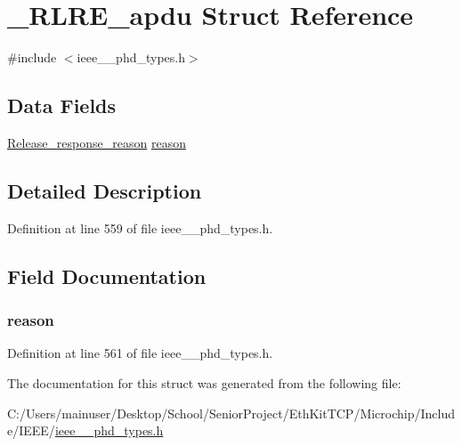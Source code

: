 \hypertarget{struct___r_l_r_e__apdu}{}\section{\+\_\+\+R\+L\+R\+E\+\_\+apdu Struct Reference}
\label{struct___r_l_r_e__apdu}


{\ttfamily \#include $<$ieee\+\_\+\_\+phd\+\_\+types.\+h$>$}

\subsection*{Data Fields}
\begin{DoxyCompactItemize}
\item 
\hyperlink{ieee__11073__phd__types_8h_ac51ddfbfdb1b2d5911d3be45a263d7ba}{Release\+\_\+response\+\_\+reason} \hyperlink{struct___r_l_r_e__apdu_a0f6114af3000175b2b0e7743d49b7ec1}{reason}
\end{DoxyCompactItemize}


\subsection{Detailed Description}


Definition at line 559 of file ieee\+\_\+\_\+phd\+\_\+types.\+h.



\subsection{Field Documentation}
\hypertarget{struct___r_l_r_e__apdu_a0f6114af3000175b2b0e7743d49b7ec1}{}
\subsubsection[{reason}]{ reason}\label{struct___r_l_r_e__apdu_a0f6114af3000175b2b0e7743d49b7ec1}


Definition at line 561 of file ieee\+\_\+\_\+phd\+\_\+types.\+h.



The documentation for this struct was generated from the following file\+:\begin{DoxyCompactItemize}
\item 
C\+:/\+Users/mainuser/\+Desktop/\+School/\+Senior\+Project/\+Eth\+Kit\+T\+C\+P/\+Microchip/\+Include/\+I\+E\+E\+E/\hyperlink{ieee__11073__phd__types_8h}{ieee\+\_\+\_\+phd\+\_\+types.\+h}\end{DoxyCompactItemize}
